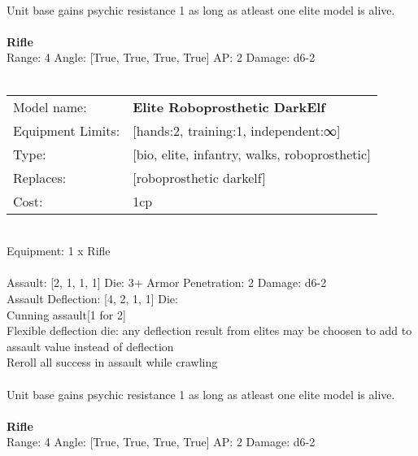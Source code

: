 \ \\
Unit base gains psychic resistance 1 as long as atleast one elite model is alive.\\ 

\ \\
{\bf Rifle } \\



Range: 4  Angle: [True, True, True, True] AP: 2 Damage: d6-2 \\




 
\ \\

\noindent
\begin{tabular}{ll}
Model name: &{\bf Elite Roboprosthetic DarkElf } \\
Equipment Limits: &[hands:2, training:1, independent:∞] \\
Type: &[bio, elite, infantry, walks, roboprosthetic] \\
Replaces: &[roboprosthetic darkelf] \\
Cost: & 1cp\\
\end{tabular}
\ \\
Equipment: 1 x Rifle \\
\ \\
Assault: [2, 1, 1, 1] Die: 3+ Armor Penetration: 2 Damage: d6-2 \\
Assault Deflection: [4, 2, 1, 1] Die: \\
\indent Cunning assault[1 for 2]\\ 
Flexible deflection die: any deflection result from elites may be choosen to add to assault value instead of deflection\\ 
Reroll all success in assault while crawling\\ 
 
\ \\
Unit base gains psychic resistance 1 as long as atleast one elite model is alive.\\ 

\ \\
{\bf Rifle } \\



Range: 4  Angle: [True, True, True, True] AP: 2 Damage: d6-2 \\




 
\ \\

